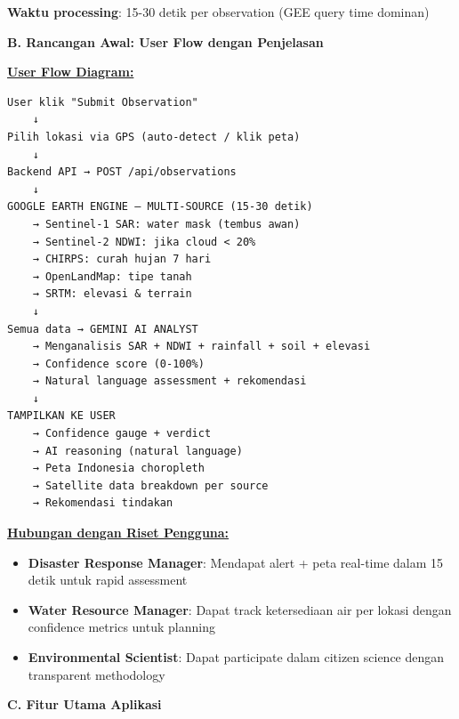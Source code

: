 \documentclass[12pt,a4paper]{article}
\newcommand{\subsectionbox}[1]{%
  \textbf{\large #1}\\[0.3cm]
}
\begin{document}
\textbf{Waktu processing}: 15-30 detik per observation (GEE query time dominan)

\subsectionbox{B. Rancangan Awal: User Flow dengan Penjelasan}

\vspace{0.3cm}

\textbf{\underline{User Flow Diagram:}}

\begin{verbatim}
User klik "Submit Observation"
    ↓
Pilih lokasi via GPS (auto-detect / klik peta)
    ↓
Backend API → POST /api/observations
    ↓
GOOGLE EARTH ENGINE — MULTI-SOURCE (15-30 detik)
    → Sentinel-1 SAR: water mask (tembus awan)
    → Sentinel-2 NDWI: jika cloud < 20%
    → CHIRPS: curah hujan 7 hari
    → OpenLandMap: tipe tanah
    → SRTM: elevasi & terrain
    ↓
Semua data → GEMINI AI ANALYST
    → Menganalisis SAR + NDWI + rainfall + soil + elevasi
    → Confidence score (0-100%)
    → Natural language assessment + rekomendasi
    ↓
TAMPILKAN KE USER
    → Confidence gauge + verdict
    → AI reasoning (natural language)
    → Peta Indonesia choropleth
    → Satellite data breakdown per source
    → Rekomendasi tindakan
\end{verbatim}

\vspace{0.3cm}

\textbf{\underline{Hubungan dengan Riset Pengguna:}}

\begin{itemize}
  \item \textbf{Disaster Response Manager}: Mendapat alert + peta real-time dalam 15 detik untuk rapid assessment
  \item \textbf{Water Resource Manager}: Dapat track ketersediaan air per lokasi dengan confidence metrics untuk planning
  \item \textbf{Environmental Scientist}: Dapat participate dalam citizen science dengan transparent methodology
\end{itemize}

\subsectionbox{C. Fitur Utama Aplikasi}
\end{document}
